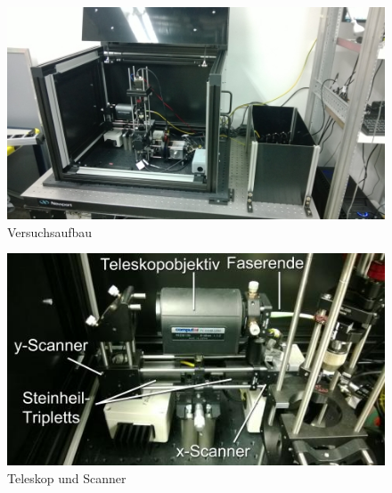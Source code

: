 \begin{minipage}{\linewidth}
\begin{figure}[H]
	\centering
\includegraphics[width=1.0\linewidth]{IMAGE/versuchsaufbau.png}
	\caption{Versuchsaufbau \cite{Anleitung}}
	\label{fig:versuchsaufbau}
\end{figure} 

\begin{figure}[H]
	\centering
\includegraphics[width=1.0\linewidth]{IMAGE/scanner.jpeg}
	\caption{Teleskop und Scanner \cite{Anleitung}}
	\label{fig:scanner}
\end{figure}

\end{minipage}

